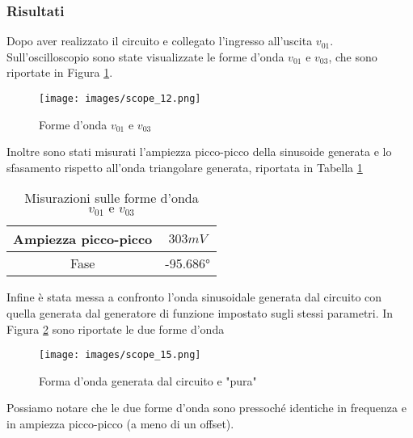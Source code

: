 \subsubsection{Risultati}
Dopo aver realizzato il circuito e collegato l'ingresso all'uscita $v_{01}$. Sull'oscilloscopio sono state visualizzate le forme d'onda $v_{01}\text{ e }v_{03}$, che sono riportate in Figura \ref{fig:Ris2.1}.
\begin{figure}[H]
    \centering
    \texttt{[image: images/scope\_12.png]}
    \caption{Forme d'onda $v_{01}\text{ e }v_{03}$}
    \label{fig:Ris2.1}
\end{figure}
Inoltre sono stati misurati l'ampiezza picco-picco della sinusoide generata e lo sfasamento rispetto all'onda triangolare generata, riportata in Tabella \ref{tab:Ris2.1}
\begin{table}[H]
    \centering
    \begin{tabular}{||c|c||}
        \hline
        Ampiezza picco-picco&$303mV$\\\hline
        Fase&-95.686°\\\hline
    \end{tabular}
    \caption{Misurazioni sulle forme d'onda $v_{01}\text{ e }v_{03}$}
    \label{tab:Ris2.1}
\end{table}
Infine è stata messa a confronto l'onda sinusoidale generata dal circuito con quella generata dal generatore di funzione impostato sugli stessi parametri. In Figura \ref{fig:Ris2.2} sono riportate le due forme d'onda
\begin{figure}[H]
    \centering
    \texttt{[image: images/scope\_15.png]}
    \caption{Forma d'onda generata dal circuito e "pura"}
    \label{fig:Ris2.2}
\end{figure}
Possiamo notare che le due forme d'onda sono pressoché identiche in frequenza e in ampiezza picco-picco (a meno di un offset).
